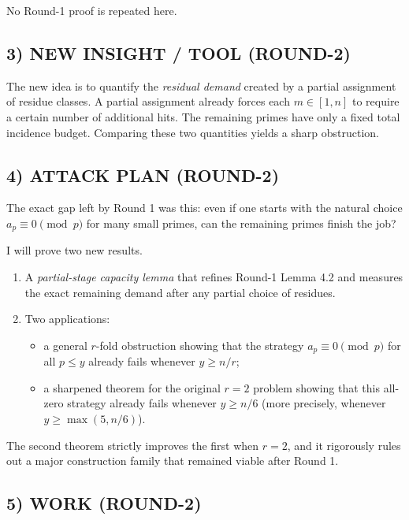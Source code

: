 No Round-1 proof is repeated here.

\subsection*{3) NEW INSIGHT / TOOL (ROUND-2)}

The new idea is to quantify the \emph{residual demand} created by a partial assignment of residue classes.
A partial assignment already forces each \(m\in[1,n]\) to require a certain number of additional hits.
The remaining primes have only a fixed total incidence budget.
Comparing these two quantities yields a sharp obstruction.

\subsection*{4) ATTACK PLAN (ROUND-2)}

The exact gap left by Round 1 was this: even if one starts with the natural choice
\(a_p\equiv 0\pmod p\) for many small primes, can the remaining primes finish the job?

I will prove two new results.
\begin{enumerate}
\item A \emph{partial-stage capacity lemma} that refines Round-1 Lemma 4.2 and measures the exact remaining demand after any partial choice of residues.
\item Two applications:
  \begin{itemize}
  \item a general \(r\)-fold obstruction showing that the strategy \(a_p\equiv 0\pmod p\) for all \(p\le y\) already fails whenever \(y\ge n/r\);
  \item a sharpened theorem for the original \(r=2\) problem showing that this all-zero strategy already fails whenever \(y\ge n/6\) (more precisely, whenever \(y\ge \max(5,n/6)\)).
  \end{itemize}
\end{enumerate}

The second theorem strictly improves the first when \(r=2\), and it rigorously rules out a major construction family that remained viable after Round 1.

\subsection*{5) WORK (ROUND-2)}


